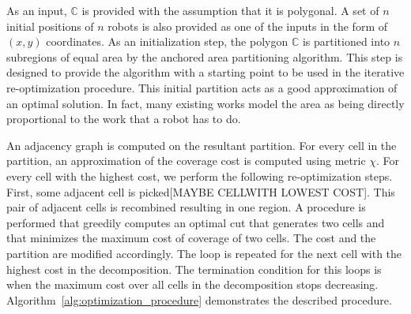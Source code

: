 \documentclass[../main.tex]{subfiles}
\begin{document}
As an input, $\mathbb{C}$ is provided with the assumption that it is polygonal. A set of $n$ initial positions of $n$ robots is also provided as one of the inputs in the form of $(x,y)$ coordinates. As an initialization step, the polygon $\mathbb{C}$ is partitioned into $n$ subregions of equal area by the anchored area partitioning algorithm. This step is designed to provide the algorithm  with a starting point to be used in the iterative re-optimization procedure. This initial partition acts as a good approximation of an optimal solution. In fact, many existing works model the area as being directly proportional to the work that a robot has to do.

An adjacency graph is computed on the resultant partition. For every cell in the partition, an approximation of the coverage cost is computed using metric $\chi$. For every cell with the highest cost, we perform the following re-optimization steps. First, some adjacent cell is picked[MAYBE CELLWITH LOWEST COST]. This pair of adjacent cells is recombined resulting in one region. A procedure is performed that greedily computes an optimal cut that generates two cells and that minimizes the maximum cost of coverage of two cells. The cost and the partition are modified accordingly. The loop is repeated for the next cell with the highest cost in the decomposition. The termination condition for this loops is when the maximum cost over all cells in the decomposition stops decreasing. Algorithm~\ref{alg:optimization_procedure} demonstrates the described procedure.
\end{document}
